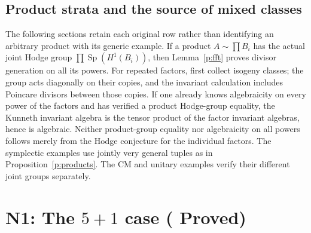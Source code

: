\documentclass[11pt,reqno]{article}
\theoremstyle{emphasizedplain}
\DeclareRobustCommand{\provedstatus}{%
  \texorpdfstring{\textcolor{ProvedGreen}{\textbf{Proved}}}{Proved}}
\theoremstyle{emphasizeddefinition}
\theoremstyle{emphasizeddefinition}
\DeclareMathOperator{\Sp}{Sp}
\begin{document}
\subsection*{Product strata and the source of mixed classes}
The following sections retain each original row rather than identifying
an arbitrary product with its generic example. If a product $A\sim\prod B_i$
has the actual joint Hodge group $\prod\Sp(H^1(B_i))$, then
Lemma~\ref{p:fft} proves divisor generation on all its powers.
For repeated factors, first collect isogeny classes; the group acts
diagonally on their copies, and the invariant calculation includes
Poincare divisors between those copies.
If one already knows algebraicity on every power of the factors and
has verified a product Hodge-group equality, the Kunneth invariant
algebra is the tensor product of the factor invariant algebras, hence
is algebraic. Neither product-group equality nor algebraicity on all
powers follows merely from the Hodge conjecture for the individual factors.
The symplectic examples use jointly very general tuples as in
Proposition~\ref{p:products}. The CM and unitary examples verify their
different joint groups separately.
\section{N1: The \texorpdfstring{$5+1$}{5+1} case (\provedstatus)}\label{sec:N1}
\end{document}
